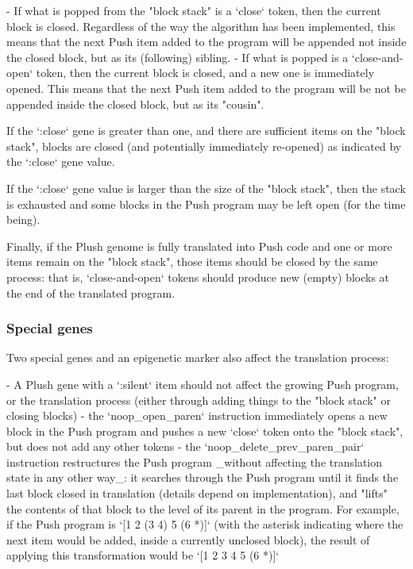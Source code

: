 - If what is popped from the "block stack" is a `close` token, then the current block is closed. Regardless of the way the algorithm has been implemented, this means that the next Push item added to the program will be appended not inside the closed block, but as its (following) sibling.
- If what is popped is a `close-and-open` token, then the current block is closed, and a new one is immediately opened. This means that the next Push item added to the program will be not be appended inside the closed block, but as its "cousin".

If the `:close` gene is greater than one, and there are sufficient items on the "block stack", blocks are closed (and potentially immediately re-opened) as indicated by the `:close` gene value.

If the `:close` gene value is larger than the size of the "block stack", then the stack is exhausted and some blocks in the Push program may be left open (for the time being).

Finally, if the Plush genome is fully translated into Push code and one or more items remain on the "block stack", those items should be closed by the same process: that is, `close-and-open` tokens should produce new (empty) blocks at the end of the translated program.

\subsubsection{ Special genes}

Two special genes and an epigenetic marker also affect the translation process:

- A Plush gene with a `:silent` item should not affect the growing Push program, or the translation process (either through adding things to the "block stack" or closing blocks)
- the  `noop\_open\_paren`  instruction immediately opens a new block in the Push program and pushes a new `close` token onto the "block stack", but does not add any other tokens
- the  `noop\_delete\_prev\_paren\_pair`  instruction restructures the Push program \_without affecting the translation state in any other way\_: it searches through the Push program until it finds the last block closed in translation (details depend on implementation), and "lifts" the contents of that block to the level of its parent in the program. For example, if the Push program is `[1 2 (3 4) 5 (6 *)]` (with the asterisk indicating where the next item would be added, inside a currently unclosed block), the result of applying this transformation would be `[1 2 3 4 5 (6 *)]`

